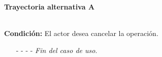 \hypertarget{CU12-5:TAA}{\textbf{Trayectoria alternativa A}}\\
\noindent \textbf{Condición:} El actor desea cancelar la operación.
\begin{enumerate}
	\UCpaso[\UCactor] Oprime el botón  de la pantalla emergente.
	\UCpaso[\UCsist] Muestra la pantalla .
	\item[- -] - - {\em {Fin del caso de uso}}.%
\end{enumerate}
